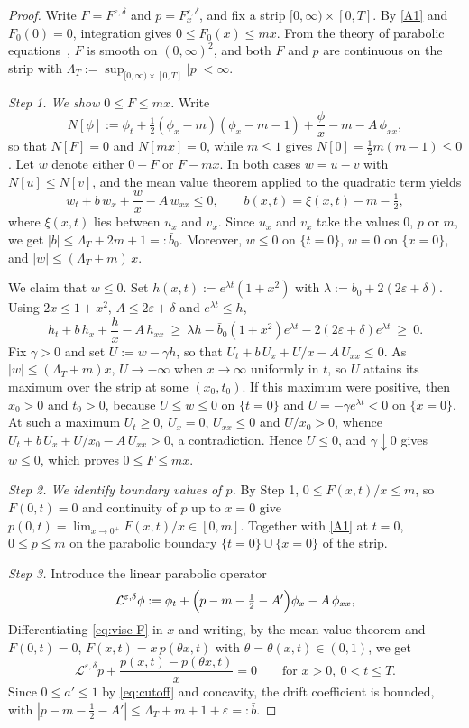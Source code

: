 \documentclass[12pt]{amsart}
\numberwithin{equation}{section}
\theoremstyle{plain}
\theoremstyle{definition}
\newcommand{\eps}{\varepsilon}
\newcommand{\Lop}{\mathcal{L}}
\begin{document}
\begin{proof}
	Write $F=F^{\eps,\delta}$ and $p=F^{\eps,\delta}_x$, and fix a strip
	$[0,\infty)\times[0,T]$. By \ref{A1} and $F_0(0)=0$, integration gives
	$0\le F_0(x)\le mx$. From the theory of parabolic equations~\cite{LSU}, $F$
	is smooth on $(0,\infty)^2$, and both $F$ and $p$ are continuous on the
	strip with $\Lambda_T:=\sup_{[0,\infty)\times[0,T]}|p|<\infty$.

	\emph{Step 1. We show $0\le F\le mx$.}
	Write
	\[
		N[\phi]:=\phi_t+\tfrac12(\phi_x-m)(\phi_x-m-1)+\frac{\phi}{x}-m
		-A\,\phi_{xx},
	\]
	so that $N[F]=0$ and $N[mx]=0$, while $m\le1$ gives
	$N[0]=\tfrac12 m(m-1)\le0$. Let $w$ denote either $0-F$ or $F-mx$. In both
	cases $w=u-v$ with $N[u]\le N[v]$, and the mean value theorem applied to the
	quadratic term yields
	\[
		w_t+b\,w_x+\frac{w}{x}-A\,w_{xx}\le0,
		\qquad b(x,t)=\xi(x,t)-m-\tfrac12,
	\]
	where $\xi(x,t)$ lies between $u_x$ and $v_x$. Since $u_x$ and $v_x$ take
	the values $0$, $p$ or $m$, we get $|b|\le\Lambda_T+2m+1=:\bar b_0$.
	Moreover, $w\le0$ on $\{t=0\}$, $w=0$ on $\{x=0\}$, and
	$|w|\le(\Lambda_T+m)\,x$.

	We claim that $w \leq 0$. Set
	$h(x,t):=e^{\lambda t}(1+x^{2})$ with $\lambda:=\bar b_0+2(2\eps+\delta)$.
	Using $2x\le1+x^{2}$, $A\le2\eps+\delta$ and $e^{\lambda t}\le h$,
	\[
		h_t+b\,h_x+\frac{h}{x}-A\,h_{xx}
		\ \ge\ \lambda h-\bar b_0(1+x^{2})e^{\lambda t}
		-2(2\eps+\delta)e^{\lambda t}\ \ge\ 0 .
	\]
	Fix $\gamma>0$ and set $U:=w-\gamma h$, so that
	$U_t+b\,U_x+U/x-A\,U_{xx}\le0$. As $|w|\le(\Lambda_T+m)x$, $U\to-\infty$
	when $x\to\infty$ uniformly in $t$, so $U$ attains its maximum over the
	strip at some $(x_0,t_0)$. If this maximum were positive, then $x_0>0$ and
	$t_0>0$, because $U\le w\le0$ on $\{t=0\}$ and $U=-\gamma e^{\lambda t}<0$
	on $\{x=0\}$. At such a maximum $U_t\ge0$, $U_x=0$, $U_{xx}\le0$ and
	$U/x_0>0$, whence $U_t+b\,U_x+U/x_0-A\,U_{xx}>0$, a contradiction. Hence
	$U\le0$, and $\gamma\downarrow0$ gives $w\le0$, which proves
	$0\le F\le mx$.

	\emph{Step 2. We identify boundary values of $p$.}
	By Step 1, $0\le F(x,t)/x\le m$, so $F(0,t)=0$ and continuity of $p$ up to
	$x=0$ give $p(0,t)=\lim_{x\to0^{+}}F(x,t)/x\in[0,m]$. Together with
	\ref{A1} at $t=0$, $0\le p\le m$ on the parabolic boundary
	$\{t=0\}\cup\{x=0\}$ of the strip.

	\emph{Step 3.}
	Introduce the linear parabolic operator
	\[
		\Lop^{\eps,\delta}\phi:=\phi_t+\Bigl(p-m-\tfrac12-A'\Bigr)\phi_x
		-A\,\phi_{xx},
	\]
	Differentiating \eqref{eq:visc-F} in $x$ and writing, by the mean value
	theorem and $F(0,t)=0$, $F(x,t)=x\,p(\theta x,t)$ with
	$\theta=\theta(x,t)\in(0,1)$, we get
	\[
		\Lop^{\eps,\delta}p+\frac{p(x,t)-p(\theta x,t)}{x}=0
		\qquad\text{for }x>0,\ 0<t\le T .
	\]
	Since $0\le a'\le1$ by \eqref{eq:cutoff} and concavity, the drift
	coefficient is bounded, with $|p-m-\tfrac12-A'|\le\Lambda_T+m+1+\eps
		=:\bar b$.


\end{proof}
\end{document}
